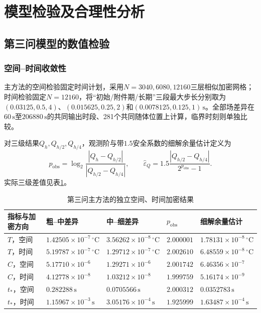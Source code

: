 \documentclass[withoutpreface,bwprint]{cumcmthesis}
\begin{document}
\section{模型检验及合理性分析}

\subsection{第三问模型的数值检验}

\subsubsection{空间--时间收敛性}

主方法的空间检验固定时间计划，采用$N=3040,6080,12160$三层相似加密网格；时间检验固定$N=12160$，将“初始/附件期/长期”三段最大步长分别取为$(0.03125,0.5,4)$、$(0.015625,0.25,2)$和$(0.0078125,0.125,1)\,\mathrm s$。全部场差异在$60\,\mathrm s$至$206880\,\mathrm s$的共同输出时段、281个共同随体位置上计算，临界时刻则单独比较。

对三级结果$Q_h,Q_{h/2},Q_{h/4}$，观测阶与带$1.5$安全系数的细解余量估计定义为\cite{roache1998}
\begin{equation}
p_{\mathrm{obs}}
=\log_2\frac{|Q_h-Q_{h/2}|}{|Q_{h/2}-Q_{h/4}|},
\qquad
\widehat\varepsilon_Q
=1.5\frac{|Q_{h/2}-Q_{h/4}|}{2^{p_{\mathrm{obs}}}-1}.
\label{eq:q3-richardson-estimate}
\end{equation}
实际三级差值见表\ref{tab:q3-convergence}。

\begin{table}[H]
\centering
\small
\renewcommand{\arraystretch}{1.15}
\caption{第三问主方法的独立空间、时间加密结果}
\label{tab:q3-convergence}
\begin{tabularx}{\textwidth}{>{\raggedright\arraybackslash}p{} >{\centering\arraybackslash}X >{\centering\arraybackslash}X >{\centering\arraybackslash}p{} >{\centering\arraybackslash}X}
\hline
指标与加密方向 & 粗--中差异 & 中--细差异 & $p_{\mathrm{obs}}$ & 细解余量估计\\
\hline
$T$，空间 & $1.42505\times10^{-7}\,{}^\circ\mathrm C$ & $3.56262\times10^{-8}\,{}^\circ\mathrm C$ & $2.000001$ & $1.78131\times10^{-8}\,{}^\circ\mathrm C$\\
$T$，时间 & $5.19787\times10^{-7}\,{}^\circ\mathrm C$ & $1.29712\times10^{-7}\,{}^\circ\mathrm C$ & $2.002610$ & $6.48559\times10^{-8}\,{}^\circ\mathrm C$\\
$C$，空间 & $5.17710\times10^{-6}$ & $1.29271\times10^{-6}$ & $2.001742$ & $6.46356\times10^{-7}$\\
$C$，时间 & $4.12778\times10^{-8}$ & $1.03212\times10^{-8}$ & $1.999759$ & $5.16174\times10^{-9}$\\
$t_*$，空间 & $0.282288\,\mathrm s$ & $0.0705566\,\mathrm s$ & $2.000312$ & $0.0352783\,\mathrm s$\\
$t_*$，时间 & $1.15967\times10^{-3}\,\mathrm s$ & $3.05176\times10^{-4}\,\mathrm s$ & $1.925999$ & $1.63487\times10^{-4}\,\mathrm s$\\
\hline
\end{tabularx}
\end{table}
\end{document}
